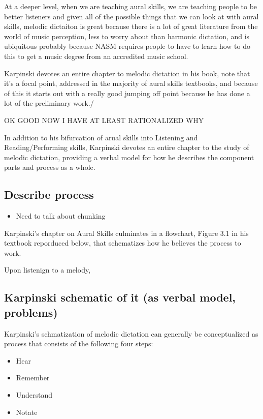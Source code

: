 \documentclass[]{book}
\providecommand{\tightlist}{%
  \setlength{\itemsep}{0pt}\setlength{\parskip}{0pt}}
\theoremstyle{definition}
\theoremstyle{definition}
\theoremstyle{definition}
\theoremstyle{remark}
\begin{document}
At a deeper level, when we are teaching aural skills, we are teaching
people to be better listeners and given all of the possible things that
we can look at with aural skills, melodic dictaiton is great because
there is a lot of great literature from the world of music perception,
less to worry about than harmonic dictation, and is ubiquitous probably
because NASM requires people to have to learn how to do this to get a
music degree from an accredited music school.

Karpinski devotes an entire chapter to melodic dictation in his book,
note that it's a focal point, addressed in the majority of aural skills
textbooks, and because of this it starts out with a really good jumping
off point because he has done a lot of the preliminary work./

OK GOOD NOW I HAVE AT LEAST RATIONALIZED WHY

In addition to his bifurcation of arual skills into Listening and
Reading/Performing skills, Karpinski devotes an entire chapter to the
study of melodic dictation, providing a verbal model for how he
describes the component parts and process as a whole.

\hypertarget{describe-process}{%
\subsection{Describe process}\label{describe-process}}

\begin{itemize}
\tightlist
\item
  Need to talk about chunking
\end{itemize}

Karpinski's chapter on Aural Skills culminates in a flowchart, Figure
3.1 in his textbook reporduced below, that schematizes how he believes
the process to work.

Upon listenign to a melody,

\hypertarget{karpinski-schematic-of-it-as-verbal-model-problems}{%
\subsection{Karpinski schematic of it (as verbal model,
problems)}\label{karpinski-schematic-of-it-as-verbal-model-problems}}

Karpinski's schmatization of melodic dictation can generally be
conceptualized as process that consists of the following four steps:

\begin{itemize}
\tightlist
\item
  Hear
\item
  Remember
\item
  Understand
\item
  Notate
\end{itemize}
\end{document}

